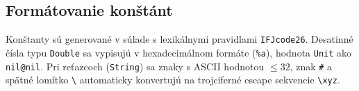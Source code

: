 \subsection{Formátovanie konštánt}
Konštanty sú generované v súlade s lexikálnymi pravidlami \texttt{IFJcode26}. Desatinné čísla typu \texttt{Double} sa vypisujú v hexadecimálnom formáte (\texttt{\%a}), hodnota \texttt{Unit} ako \texttt{nil@nil}. Pri reťazcoch (\texttt{String}) sa znaky s ASCII hodnotou $\leq 32$, znak \texttt{\#} a spätné lomítko \texttt{\textbackslash} automaticky konvertujú na trojciferné escape sekvencie \texttt{\textbackslash xyz}.